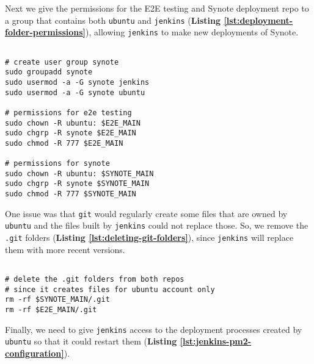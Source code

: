 Next we give the permissions for the E2E testing and Synote deployment repo to a group that contains both \texttt{ubuntu} and \texttt{jenkins} (\textbf{Listing \ref{lst:deployment-folder-permissions}}), allowing \texttt{jenkins} to make new deployments of Synote.\\

\begin{listing}[H]
\begin{verbatim}

# create user group synote
sudo groupadd synote
sudo usermod -a -G synote jenkins
sudo usermod -a -G synote ubuntu

# permissions for e2e testing
sudo chown -R ubuntu: $E2E_MAIN
sudo chgrp -R synote $E2E_MAIN
sudo chmod -R 777 $E2E_MAIN

# permissions for synote
sudo chown -R ubuntu: $SYNOTE_MAIN
sudo chgrp -R synote $SYNOTE_MAIN
sudo chmod -R 777 $SYNOTE_MAIN

\end{verbatim}
\label{lst:deployment-folder-permissions}
\end{listing}

One issue was that \texttt{git} would regularly create some files that are owned by \texttt{ubuntu} and the files built by \texttt{jenkins} could not replace those. So, we remove the \texttt{.git} folders (\textbf{Listing \ref{lst:deleting-git-folders}}), since \texttt{jenkins} will replace them with more recent versions.\\

\begin{listing}[H]
\begin{verbatim}

# delete the .git folders from both repos
# since it creates files for ubuntu account only
rm -rf $SYNOTE_MAIN/.git
rm -rf $E2E_MAIN/.git

\end{verbatim}
\label{lst:deleting-git-folders}
\end{listing}

Finally, we need to give \texttt{jenkins} access to the deployment processes created by \texttt{ubuntu} so that it could restart them (\textbf{Listing \ref{lst:jenkins-pm2-configuration}}).\\

